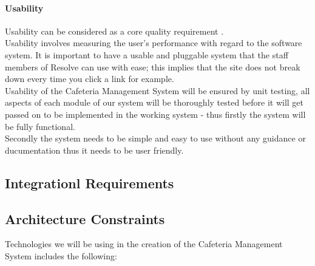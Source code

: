 \documentclass[12pt]{article}
\begin{document}
\paragraph{Usability\\}
Usability can be considered as a core quality requirement . \\
Usability involves measuring the user's performance with regard to the software system.  It is important to have a usable and pluggable system that the staff members of Resolve can use with ease; this implies that the site does not break down every time you click a link for example. \\
Usability of the Cafeteria Management System will be ensured by unit testing, all aspects of each module of our system will be thoroughly  tested before it will get passed on to be implemented in the working system - thus firstly the system will be fully functional.\\
Secondly the system needs to be simple and easy to use without any guidance or ducumentation thus it needs to be user friendly. 



\subsection{Integrationl Requirements}

\subsection{Architecture Constraints}
Technologies we will be using in the creation of the Cafeteria Management System includes the following: 
\end{document}
